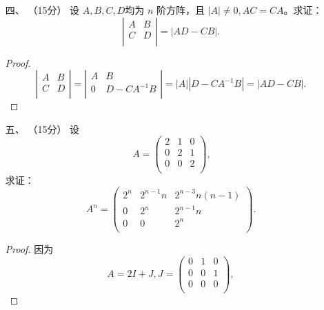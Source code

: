 \begin{enumerate}[1~]
\begin{proof}
\[\]
由于$\boldsymbol{\varepsilon} _ { 1 } , \boldsymbol{\varepsilon} _ { 2 } , \dots , \boldsymbol{\varepsilon} _ { n }$线性无关，因此${\rm rank}\{\boldsymbol{\varepsilon} _ { 1 } , \boldsymbol{\varepsilon} _ { 2 } , \dots , \boldsymbol{\varepsilon} _ { n }\}=n$。从而${\rm rank}\{\boldsymbol { \boldsymbol{\alpha} } _ { 1 } , \boldsymbol { \boldsymbol{\alpha} } _ { 2 } , \dots , \boldsymbol { \boldsymbol{\alpha} } _ { n }\}=n$。
于是$\boldsymbol { \boldsymbol{\alpha} } _ { 1 } , \boldsymbol { \boldsymbol{\alpha} } _ { 2 } , \dots , \boldsymbol { \boldsymbol{\alpha} } _ { n }$线性无关。
\end{proof}

\item[四、]（15分）
设 $A, B, C, D $均为 $n$ 阶方阵，且 $|A| \ne 0, AC = CA$。求证：\[
\left| \begin{matrix}
	A&		B\\
	C&		D\\
\end{matrix} \right|=|AD-CB|.
\]
\begin{proof}
\[
\left| \begin{matrix}
	A&		B\\
	C&		D\\
\end{matrix} \right| = 
\left| \begin{matrix}
	A&		B\\
	0&		D-CA^{-1}B\\
\end{matrix} \right| = 
|A||D-CA^{-1}B|=|AD-CB|.
\]
\end{proof}

\item[五、]（15分）
设
$$\
A=\left( \begin{matrix}
	2&		1&		0\\
	0&		2&		1\\
	0&		0&		2\\
\end{matrix} \right),
$$
求证：\[
A^n=\left( \begin{matrix}
	2^n&		2^{n-1}n&		2^{n-3}n\left( n-1 \right)\\
	0&		2^n&		2^{n-1}n\\
	0&		0&		2^n\\
\end{matrix} \right) .
\]

\begin{proof}
因为
$$
A=2I+J, J=\left( \begin{matrix}
	0&		1&		0\\
	0&		0&		1\\
	0&		0&		0\\
\end{matrix} \right),
$$


\end{proof}
\end{enumerate}
